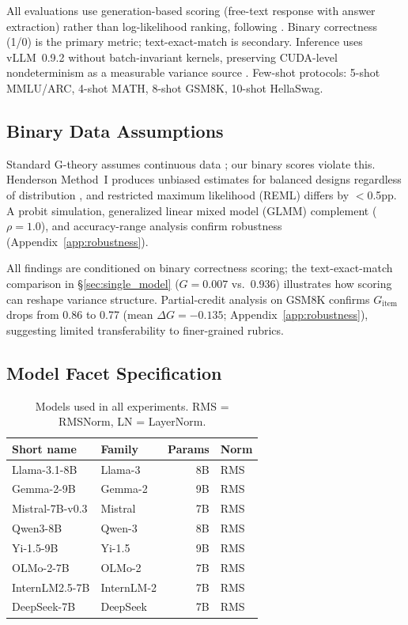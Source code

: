 All evaluations use generation-based scoring (free-text response with answer extraction) rather than log-likelihood ranking, following \citet{hua2025flaw}. Binary correctness (1/0) is the primary metric; text-exact-match is secondary. Inference uses vLLM~0.9.2 without batch-invariant kernels, preserving CUDA-level nondeterminism as a measurable variance source \cite{messina2026background, thinkingmachines2025batch}. Few-shot protocols: 5-shot MMLU/ARC, 4-shot MATH, 8-shot GSM8K, 10-shot HellaSwag.

\subsection{Binary Data Assumptions}
\label{sec:binary}

Standard G-theory assumes continuous data \cite{shavelson1991generalizability}; our binary scores violate this. Henderson Method~I produces unbiased estimates for balanced designs regardless of distribution \cite[Ch.~12]{brennan2001generalizability}, and restricted maximum likelihood (REML) differs by $<$0.5pp. A probit simulation, generalized linear mixed model (GLMM) complement ($\rho = 1.0$), and accuracy-range analysis confirm robustness (Appendix~\ref{app:robustness}).

All findings are conditioned on binary correctness scoring; the text-exact-match comparison in \S\ref{sec:single_model} ($G = 0.007$ vs.\ $0.936$) illustrates how scoring can reshape variance structure. Partial-credit analysis on GSM8K confirms $G_\text{item}$ drops from 0.86 to 0.77 (mean $\Delta G = -0.135$; Appendix~\ref{app:robustness}), suggesting limited transferability to finer-grained rubrics.

\subsection{Model Facet Specification}

\begin{table}[t]
\centering
\caption{Models used in all experiments. RMS = RMSNorm, LN = LayerNorm.}
\label{tab:model_ids}
\scriptsize
\begin{tabular*}{\columnwidth}{@{\extracolsep{\fill}}llrl@{}}
\toprule
Short name & Family & Params & Norm \\
\midrule
Llama-3.1-8B & Llama-3 & 8B & RMS \\
Gemma-2-9B & Gemma-2 & 9B & RMS \\
Mistral-7B-v0.3 & Mistral & 7B & RMS \\
Qwen3-8B & Qwen-3 & 8B & RMS \\
Yi-1.5-9B & Yi-1.5 & 9B & RMS \\
OLMo-2-7B & OLMo-2 & 7B & RMS \\
InternLM2.5-7B & InternLM-2 & 7B & RMS \\
DeepSeek-7B & DeepSeek & 7B & RMS \\
\bottomrule
\end{tabular*}
\end{table}

